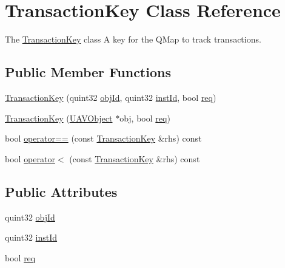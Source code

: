 \hypertarget{class_transaction_key}{\section{\-Transaction\-Key \-Class \-Reference}
\label{class_transaction_key}
}


\-The \hyperlink{class_transaction_key}{\-Transaction\-Key} class \-A key for the \-Q\-Map to track transactions.  


\subsection*{\-Public \-Member \-Functions}
\begin{DoxyCompactItemize}
\item 
\hyperlink{group___u_a_v_talk_plugin_gad570ba59a89b2499d1fa950f756f029e}{\-Transaction\-Key} (quint32 \hyperlink{group___u_a_v_talk_plugin_ga23b79980c6f897e84ca1b88c5bb532ad}{obj\-Id}, quint32 \hyperlink{group___u_a_v_talk_plugin_ga3d92643b78ea3e10cd9ac1ac2cc4b5f7}{inst\-Id}, bool \hyperlink{group___u_a_v_talk_plugin_gafe5007a7f451f47110150ee417594a38}{req})
\item 
\hyperlink{group___u_a_v_talk_plugin_ga01b3c8039cd97c7da26eb79fdeed0003}{\-Transaction\-Key} (\hyperlink{class_u_a_v_object}{\-U\-A\-V\-Object} $\ast$obj, bool \hyperlink{group___u_a_v_talk_plugin_gafe5007a7f451f47110150ee417594a38}{req})
\item 
bool \hyperlink{group___u_a_v_talk_plugin_ga6619fa90d68b631eef2b94302d77df19}{operator==} (const \hyperlink{class_transaction_key}{\-Transaction\-Key} \&rhs) const 
\item 
bool \hyperlink{group___u_a_v_talk_plugin_ga535141f4efa21d7b4b5d5314c92d1c8e}{operator$<$} (const \hyperlink{class_transaction_key}{\-Transaction\-Key} \&rhs) const 
\end{DoxyCompactItemize}
\subsection*{\-Public \-Attributes}
\begin{DoxyCompactItemize}
\item 
quint32 \hyperlink{group___u_a_v_talk_plugin_ga23b79980c6f897e84ca1b88c5bb532ad}{obj\-Id}
\item 
quint32 \hyperlink{group___u_a_v_talk_plugin_ga3d92643b78ea3e10cd9ac1ac2cc4b5f7}{inst\-Id}
\item 
bool \hyperlink{group___u_a_v_talk_plugin_gafe5007a7f451f47110150ee417594a38}{req}
\end{DoxyCompactItemize}


